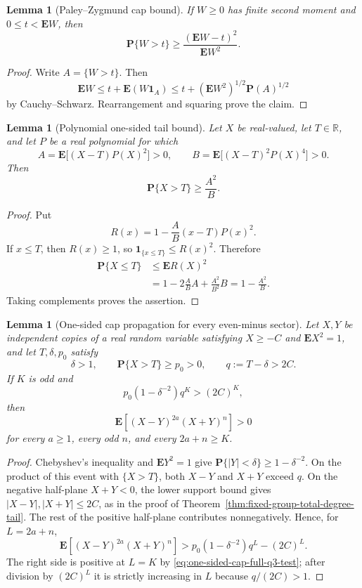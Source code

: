 \documentclass[11pt,reqno]{amsart}
\theoremstyle{plain}
\newtheorem{lemma}[theorem]{Lemma}
\theoremstyle{definition}
\begin{document}
\begin{lemma}[Paley--Zygmund cap bound]\label{lem:paley-cap}
If $W\geq0$ has finite second moment and $0\leq t<\mathbf EW$, then
\[
 \mathbf P\{W>t\}\geq
 \frac{(\mathbf EW-t)^2}{\mathbf E W^2}.
\]
\end{lemma}

\begin{proof}
Write $A=\{W>t\}$.  Then
\[
 \mathbf EW
 \leq t+\mathbf E(W\mathbf1_A)
 \leq t+(\mathbf EW^2)^{1/2}\mathbf P(A)^{1/2}
\]
by Cauchy--Schwarz.  Rearrangement and squaring prove the claim.
\end{proof}

\begin{lemma}[Polynomial one-sided tail bound]
\label{lem:polynomial-one-sided-tail}
Let $X$ be real-valued, let $T\in\mathbb R$, and let $P$ be a real
polynomial for which
\[
 A=\mathbf E\bigl[(X-T)P(X)^2\bigr]>0,
 \qquad
 B=\mathbf E\bigl[(X-T)^2P(X)^4\bigr]>0.
\]
Then
\[
 \mathbf P\{X>T\}\geq\frac{A^2}{B}.
\]
\end{lemma}

\begin{proof}
Put
\[
 R(x)=1-\frac AB(x-T)P(x)^2.
\]
If $x\leq T$, then $R(x)\geq1$, so
$\mathbf1_{\{x\leq T\}}\leq R(x)^2$.  Therefore
\[
 \begin{aligned}
 \mathbf P\{X\leq T\}
 &\leq \mathbf E R(X)^2\\
 &=1-2\frac AB A+\frac{A^2}{B^2}B
 =1-\frac{A^2}{B}.
 \end{aligned}
\]
Taking complements proves the assertion.
\end{proof}

\begin{lemma}[One-sided cap propagation for every even-minus sector]
\label{lem:one-sided-cap-full-q3}
Let $X,Y$ be independent copies of a real random variable satisfying
$X\geq-C$ and $\mathbf EX^2=1$, and let $T,\delta,p_0$ satisfy
\[
 \delta>1,\qquad
 \mathbf P\{X>T\}\geq p_0>0,\qquad
 q:=T-\delta>2C.
\]
If $K$ is odd and
\begin{equation}
\label{eq:one-sided-cap-full-q3-test}
 p_0(1-\delta^{-2})q^K>(2C)^K,
\end{equation}
then
\[
 \mathbf E[(X-Y)^{2a}(X+Y)^n]>0
\]
for every $a\geq1$, every odd $n$, and every $2a+n\geq K$.
\end{lemma}

\begin{proof}
Chebyshev's inequality and $\mathbf EY^2=1$ give
$\mathbf P\{|Y|<\delta\}\geq1-\delta^{-2}$.  On the product of this
event with $\{X>T\}$, both $X-Y$ and $X+Y$ exceed $q$.  On the negative
half-plane $X+Y<0$, the lower support bound gives
$|X-Y|,|X+Y|\leq2C$, as in the proof of
Theorem~\ref{thm:fixed-group-total-degree-tail}.  The rest of the positive
half-plane contributes nonnegatively.  Hence, for $L=2a+n$,
\[
 \mathbf E[(X-Y)^{2a}(X+Y)^n]
 >p_0(1-\delta^{-2})q^L-(2C)^L.
\]
The right side is positive at $L=K$ by
\eqref{eq:one-sided-cap-full-q3-test}; after division by $(2C)^L$ it is
strictly increasing in $L$ because $q/(2C)>1$.
\end{proof}
\end{document}
